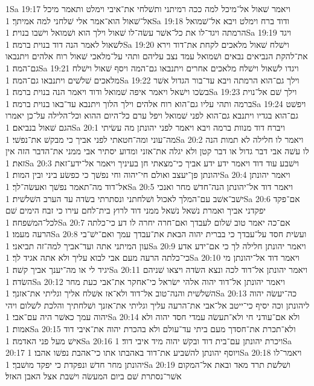 1Sa 19:17  ויאמר שׁאול אל־מיכל למה ככה רמיתני ותשׁלחי את־איבי וימלט ותאמר מיכל אל־שׁאול הוא־אמר אלי שׁלחני למה אמיתך׃
1Sa 19:18  ודוד ברח וימלט ויבא אל־שׁמואל הרמתה ויגד־לו את כל־אשׁר עשׂה־לו שׁאול וילך הוא ושׁמואל וישׁבו בנוית׃
1Sa 19:19  ויגד לשׁאול לאמר הנה דוד בנוית ברמה׃
1Sa 19:20  וישׁלח שׁאול מלאכים לקחת את־דוד וירא את־להקת הנביאים נבאים ושׁמואל עמד נצב עליהם ותהי על־מלאכי שׁאול רוח אלהים ויתנבאו גם־המה׃
1Sa 19:21  ויגדו לשׁאול וישׁלח מלאכים אחרים ויתנבאו גם־המה ויסף שׁאול וישׁלח מלאכים שׁלשׁים ויתנבאו גם־המה׃
1Sa 19:22  וילך גם־הוא הרמתה ויבא עד־בור הגדול אשׁר בשׂכו וישׁאל ויאמר איפה שׁמואל ודוד ויאמר הנה בנוית ברמה׃
1Sa 19:23  וילך שׁם אל־נוית ברמה ותהי עליו גם־הוא רוח אלהים וילך הלוך ויתנבא עד־באו בנוית ברמה׃
1Sa 19:24  ויפשׁט גם־הוא בגדיו ויתנבא גם־הוא לפני שׁמואל ויפל ערם כל־היום ההוא וכל־הלילה על־כן יאמרו הגם שׁאול בנביאם׃
1Sa 20:1  ויברח דוד מנוות ברמה ויבא ויאמר לפני יהונתן מה עשׂיתי מה־עוני ומה־חטאתי לפני אביך כי מבקשׁ את־נפשׁי׃
1Sa 20:2  ויאמר לו חלילה לא תמות הנה לו עשׁה אבי דבר גדול או דבר קטן ולא יגלה את־אזני ומדוע יסתיר אבי ממני את־הדבר הזה אין זאת׃
1Sa 20:3  וישׁבע עוד דוד ויאמר ידע ידע אביך כי־מצאתי חן בעיניך ויאמר אל־ידע־זאת יהונתן פן־יעצב ואולם חי־יהוה וחי נפשׁך כי כפשׂע ביני ובין המות׃
1Sa 20:4  ויאמר יהונתן אל־דוד מה־תאמר נפשׁך ואעשׂה־לך׃
1Sa 20:5  ויאמר דוד אל־יהונתן הנה־חדשׁ מחר ואנכי ישׁב־אשׁב עם־המלך לאכול ושׁלחתני ונסתרתי בשׂדה עד הערב השׁלשׁית׃
1Sa 20:6  אם־פקד יפקדני אביך ואמרת נשׁאל נשׁאל ממני דוד לרוץ בית־לחם עירו כי זבח הימים שׁם לכל־המשׁפחה׃
1Sa 20:7  אם־כה יאמר טוב שׁלום לעבדך ואם־חרה יחרה לו דע כי־כלתה הרעה מעמו׃
1Sa 20:8  ועשׂית חסד על־עבדך כי בברית יהוה הבאת את־עבדך עמך ואם־ישׁ־בי עון המיתני אתה ועד־אביך למה־זה תביאני׃
1Sa 20:9  ויאמר יהונתן חלילה לך כי אם־ידע אדע כי־כלתה הרעה מעם אבי לבוא עליך ולא אתה אגיד לך׃
1Sa 20:10  ויאמר דוד אל־יהונתן מי יגיד לי או מה־יענך אביך קשׁה׃
1Sa 20:11  ויאמר יהונתן אל־דוד לכה ונצא השׂדה ויצאו שׁניהם השׂדה׃
1Sa 20:12  ויאמר יהונתן אל־דוד יהוה אלהי ישׂראל כי־אחקר את־אבי כעת מחר השׁלשׁית והנה־טוב אל־דוד ולא־אז אשׁלח אליך וגליתי את־אזנך׃
1Sa 20:13  כה־יעשׂה יהוה ליהונתן וכה יסיף כי־ייטב אל־אבי את־הרעה עליך וגליתי את־אזנך ושׁלחתיך והלכת לשׁלום ויהי יהוה עמך כאשׁר היה עם־אבי׃
1Sa 20:14  ולא אם־עודני חי ולא־תעשׂה עמדי חסד יהוה ולא אמות׃
1Sa 20:15  ולא־תכרת את־חסדך מעם ביתי עד־עולם ולא בהכרת יהוה את־איבי דוד אישׁ מעל פני האדמה׃
1Sa 20:16  ויכרת יהונתן עם־בית דוד ובקשׁ יהוה מיד איבי דוד׃
1Sa 20:17  ויוסף יהונתן להשׁביע את־דוד באהבתו אתו כי־אהבת נפשׁו אהבו׃
1Sa 20:18  ויאמר־לו יהונתן מחר חדשׁ ונפקדת כי יפקד מושׁבך׃
1Sa 20:19  ושׁלשׁת תרד מאד ובאת אל־המקום אשׁר־נסתרת שׁם ביום המעשׂה וישׁבת אצל האבן האזל׃
